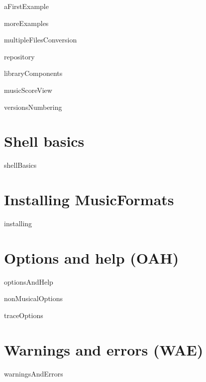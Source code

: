 \documentclass[11pt,a4paper]{report}
\begin{document}
{aFirstExample}

{moreExamples}

{multipleFilesConversion}

{repository}

{libraryComponents}

{musicScoreView}

{versionsNumbering}


\part{Shell basics}

{shellBasics}


\part{Installing MusicFormats}

{installing}


\part{Options and help (OAH)}

{optionsAndHelp}

{nonMusicalOptions}

{traceOptions}



\part{Warnings and errors (WAE)}

{warningsAndErrors}


\end{document}
